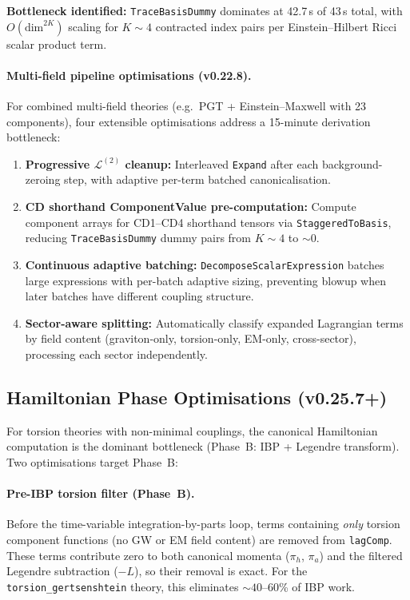 \textbf{Bottleneck identified:} \texttt{TraceBasisDummy} dominates at 42.7\,s of 43\,s total, with $O(\text{dim}^{2K})$ scaling for $K \sim 4$ contracted index pairs per Einstein--Hilbert Ricci scalar product term.

\paragraph{Multi-field pipeline optimisations (v0.22.8).}
For combined multi-field theories (e.g.\ PGT + Einstein--Maxwell with 23 components), four extensible optimisations address a 15-minute derivation bottleneck:
\begin{enumerate}
  \item \textbf{Progressive $\mathcal{L}^{(2)}$ cleanup:} Interleaved \texttt{Expand} after each background-zeroing step, with adaptive per-term batched canonicalisation.
  \item \textbf{CD shorthand ComponentValue pre-computation:} Compute component arrays for CD1--CD4 shorthand tensors via \texttt{StaggeredToBasis}, reducing \texttt{TraceBasisDummy} dummy pairs from $K \sim 4$ to $\sim$0.
  \item \textbf{Continuous adaptive batching:} \texttt{DecomposeScalarExpression} batches large expressions with per-batch adaptive sizing, preventing blowup when later batches have different coupling structure.
  \item \textbf{Sector-aware splitting:} Automatically classify expanded Lagrangian terms by field content (graviton-only, torsion-only, EM-only, cross-sector), processing each sector independently.
\end{enumerate}

\subsection{Hamiltonian Phase Optimisations (v0.25.7+)}
\label{sec:hamiltonian-phase-perf}

For torsion theories with non-minimal couplings, the canonical Hamiltonian computation is the dominant bottleneck (Phase~B: IBP + Legendre transform). Two optimisations target Phase~B:

\paragraph{Pre-IBP torsion filter (Phase~B).}
Before the time-variable integration-by-parts loop, terms containing \emph{only} torsion component functions (no GW or EM field content) are removed from \texttt{lagComp}. These terms contribute zero to both canonical momenta ($\pi_h$, $\pi_a$) and the filtered Legendre subtraction ($-L$), so their removal is exact. For the \texttt{torsion\_gertsenshtein} theory, this eliminates ${\sim}40$--60\% of IBP work.

